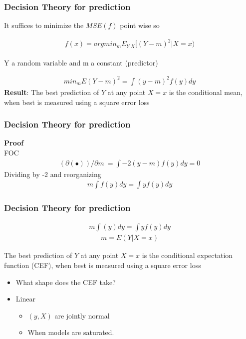 \documentclass[
  shownotes,
  xcolor={svgnames},
  hyperref={colorlinks,citecolor=DarkBlue,linkcolor=DarkRed,urlcolor=DarkBlue}
  , aspectratio=169]{beamer}
\begin{document}
\begin{frame}
\frametitle{ Decision Theory for prediction}


It suffices to minimize  the $MSE(f)$ point wise so

\begin{align}
f(x)= argmin_m E_{Y|X} [(Y-m)^2|X=x)
\end{align}

Y a random variable and m a constant (predictor)

\begin{align}
min_m E(Y-m)^2= \int (y-m)^2  f(y)dy
\end{align}
\medskip
{\bf Result}: The best prediction of $Y$ at any point $X = x$ is the conditional mean, when best is measured using a square error loss

\end{frame}

\begin{frame}[t]
\frametitle{ Decision Theory for prediction}

{\bf Proof} \\
\medskip
FOC
\medskip
\begin{align}
 \left(\partial\left(\bullet\right)\right)/\partial m\ = \int -2 (y-m)  f(y)  dy =0
\end{align}
\medskip
Dividing by -2 and reorganizing
\medskip
\begin{align}
 m \int f(y) dy = \int y f(y)  dy
\end{align}


\end{frame}

\begin{frame}
\frametitle{ Decision Theory for prediction}


\begin{align}
 m \int (y) dy = \int y f(y)  dy
\end{align}
\begin{align}
m=E(Y|X=x)
\end{align}


The best prediction of $Y$ at any point $X = x$ is the conditional expectation function (CEF), when best is measured using a square error loss
\begin{itemize}
\item What shape does the CEF take?
\item Linear 
\begin{itemize}
\item $(y,X)$ are jointly normal
\item When models are saturated.
\end{itemize}
\end{itemize}


\end{frame}
\end{document}
